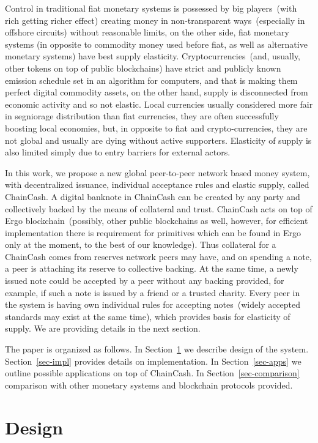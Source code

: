 \documentclass{llncs}   %
\newcommand{\cc}{ChainCash}
\begin{document}
Control in traditional fiat monetary systems is possessed by big players~(with rich getting richer effect) creating
money in non-transparent ways~(especially in offshore circuits) without reasonable limits, on the other side,
fiat monetary systems (in opposite to commodity money used before fiat, as well as alternative monetary systems) have
best supply elasticity. Cryptocurrencies~(and, usually, other tokens on top of public blockchains) have strict and
publicly known emission schedule set in an algorithm for computers, and that is making them perfect digital commodity assets,
on the other hand, supply is disconnected from economic activity and so not elastic. Local currencies usually considered
more fair in segniorage distribution than fiat currencies, they are often successfully boosting local economies, but,
in opposite to fiat and crypto-currencies, they are not global and usually are dying without active supporters.
Elasticity of supply is also limited simply due to entry barriers for external actors.

In this work, we propose a new global peer-to-peer network based money system, with decentralized issuance, individual acceptance rules and elastic supply, called \cc{}.
A digital banknote in \cc{} can be created by any party and collectively backed by the means of collateral and trust. \cc{} acts on top of Ergo blockchain~(possibly, other public blockchains
as well, however, for efficient implementation there is requirement for primitives which can be found in Ergo only at the moment, to the best of our knowledge). Thus collateral for a \cc{} comes from reserves network peers may have, and on spending a note, a peer is attaching its
reserve to collective backing. At the same time, a newly issued note could be accepted by a peer without any backing provided, for example, if such a note is issued by a friend or a trusted charity. Every peer in the system is having own individual rules
for accepting notes~(widely accepted standards may exist at the same time), which provides basis for elasticity of supply. We are providing details in the next section.

The paper is organized as follows. In Section~\ref{sec-design} we describe design of the system. Section~\ref{sec-impl} provides
details on implementation. In Section~\ref{sec-apps} we outline possible applications on top of \cc{}. In Section~\ref{sec-comparison} comparison
 with other monetary systems and blockchain protocols provided.

\section{Design}
\label{sec-design}
\end{document}
